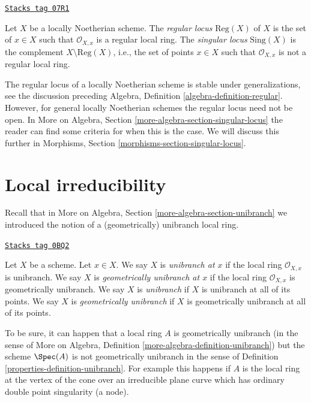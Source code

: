 \begin{definition}
\label{properties-definition-singular-locus}
\href{https://stacks.math.columbia.edu/tag/07R1}{\texttt{Stacks tag 07R1}}

Let $X$ be a locally Noetherian scheme. The {\it regular locus}
$\text{Reg}(X)$ of $X$ is the set of $x \in X$ such that $\mathcal{O}_{X, x}$
is a regular local ring. The {\it singular locus} $\text{Sing}(X)$ is the
complement $X \setminus \text{Reg}(X)$, i.e., the set of points $x \in X$
such that $\mathcal{O}_{X, x}$ is not a regular local ring.
\end{definition}

The regular locus of a locally Noetherian scheme is stable under
generalizations, see the discussion preceding
Algebra, Definition \ref{algebra-definition-regular}.
However, for general locally Noetherian schemes the regular locus
need not be open. In
More on Algebra, Section \ref{more-algebra-section-singular-locus}
the reader can find some criteria for when this is the case.
We will discuss this further in
Morphisms, Section \ref{morphisms-section-singular-locus}.

\section{Local irreducibility}
\label{properties-section-unibranch}
Recall that in More on Algebra, Section \ref{more-algebra-section-unibranch}
we introduced the notion of a (geometrically) unibranch local ring.

\begin{definition}[Unibranch]
\label{properties-definition-unibranch}
\href{https://stacks.math.columbia.edu/tag/0BQ2}{\texttt{Stacks tag 0BQ2}}

\begin{reference}
\cite[Chapter IV (6.15.1)]{EGA4}
\end{reference}
Let $X$ be a scheme. Let $x \in X$. We say $X$ is {\it unibranch at $x$}
if the local ring $\mathcal{O}_{X, x}$ is unibranch. We say $X$ is
{\it geometrically unibranch at $x$}
if the local ring $\mathcal{O}_{X, x}$ is geometrically unibranch.
We say $X$ is {\it unibranch} if $X$ is unibranch at all of its points.
We say $X$ is {\it geometrically unibranch} if $X$ is
geometrically unibranch at all of its points.
\end{definition}

To be sure, it can happen that a local ring $A$ is geometrically unibranch
(in the sense of
More on Algebra, Definition \ref{more-algebra-definition-unibranch})
but the scheme $\Spec(A)$ is not geometrically unibranch in the sense
of Definition \ref{properties-definition-unibranch}. For example this happens
if $A$ is the local ring at the vertex of the cone over an irreducible
plane curve which has ordinary double point singularity (a node).

